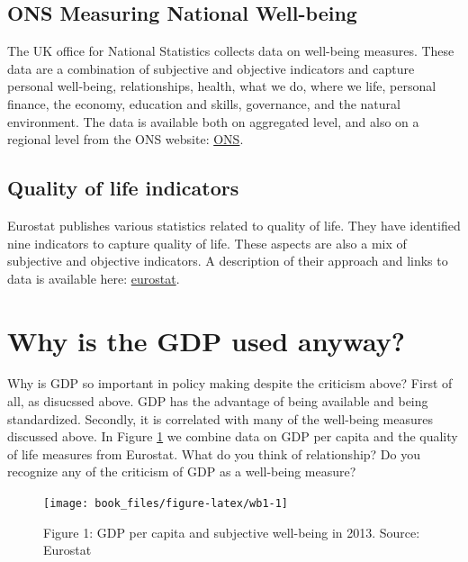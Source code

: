 \documentclass[]{book}
\begin{document}
\hypertarget{ons-measuring-national-well-being}{%
\subsection{ONS Measuring National Well-being}\label{ons-measuring-national-well-being}}

The UK office for National Statistics collects data on well-being measures. These data are a combination of subjective and objective indicators and capture personal well-being, relationships, health, what we do, where we life, personal finance, the economy, education and skills, governance, and the natural environment. The data is available both on aggregated level, and also on a regional level from the ONS website: \href{https://www.ons.gov.uk/peoplepopulationandcommunity/well-being}{ONS}.

\hypertarget{quality-of-life-indicators}{%
\subsection{Quality of life indicators}\label{quality-of-life-indicators}}

Eurostat publishes various statistics related to quality of life. They have identified nine indicators to capture quality of life. These aspects are also a mix of subjective and objective indicators. A description of their approach and links to data is available here: \href{http://ec.europa.eu/eurostat/statistics-explained/index.php/Quality_of_life_indicators_-_measuring_quality_of_life\#Overall_experience_of_life}{eurostat}.

\hypertarget{why-is-the-gdp-used-anyway}{%
\section{Why is the GDP used anyway?}\label{why-is-the-gdp-used-anyway}}

Why is GDP so important in policy making despite the criticism above? First of all, as disucssed above. GDP has the advantage of being available and being standardized. Secondly, it is correlated with many of the well-being measures discussed above. In Figure \ref{fig:wb1} we combine data on GDP per capita and the quality of life measures from Eurostat. What do you think of relationship? Do you recognize any of the criticism of GDP as a well-being measure?

\begin{figure}

{\centering \texttt{[image: book\_files/figure-latex/wb1-1]} 

}

\caption{Figure 1: GDP per capita and subjective well-being in 2013. Source: Eurostat}\label{fig:wb1}
\end{figure}
\end{document}

